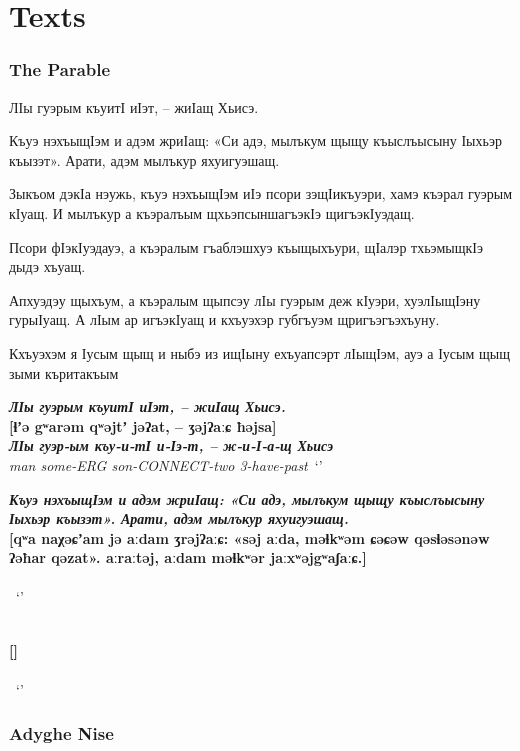 \documentclass[a4paper,12pt]{book}
\newcommand{\1}[1]{\textbf{\emph{#1}}} %
\newcommand{\2}[1]{\textbf{[#1]}} %
\newcommand{\3}[1]{\fontsize{11pt}{0cm}\textbf{\emph{#1}}} %
\newcommand{\4}[1]{\fontsize{10pt}{0cm}\emph{#1}}	%
\newcommand{\5}[1]{\textbf{/#1/}} %
\newcommand{\6}[1]{\textbf{[#1]}} %
\newcommand{\7}[1]{\fontsize{12pt}{0cm}\emph{#1}} %
\newcommand{\8}[1]{\fontsize{12pt}{0cm}`#1'} %
\newcommand{\9}[1]{\fontsize{12pt}{0cm}(lit. `#1')} %
\begin{document}
\chapter{Texts}
\subsection{The Parable}
ЛӀы гуэрым къуитӀ иӀэт, – жиӀащ Хьисэ. 

Къуэ нэхъыщӀэм и адэм жриӀащ: «Си адэ, мылъкум щыщу къыслъысыну Ӏыхьэр къызэт». Арати, адэм мылъкур яхуигуэшащ.

Зыкъом дэкӀа нэужь, къуэ нэхъыщӀэм иӀэ псори зэщӀикъуэри, хамэ къэрал гуэрым кӀуащ. И мылъкур а къэралъым щхьэпсыншагъэкӀэ щигъэкӀуэдащ. 

Псори фӀэкӀуэдауэ, а къэралым гъаблэшхуэ къыщыхъури, щӀалэр тхьэмыщкӀэ дыдэ хъуащ. 

Апхуэдэу щыхъум, а къэралым щыпсэу лӀы гуэрым деж кӀуэри, хуэлӀыщӀэну гурыӀуащ. А лӀым ар игъэкӀуащ и кхъуэхэр губгъуэм щригъэгъэхъуну.

Кхъуэхэм я Ӏусым щыщ и ныбэ из ищӀыну ехъуапсэрт лӀыщӀэм, ауэ а Ӏусым щыщ зыми къритакъым

\begin{exe}
\ex
\1{ЛӀы гуэрым къуитӀ иӀэт, – жиӀащ Хьисэ.}\\
\2{ɬʼə gʷarəm qʷəjtʼ jəʔat, – ʒəjʔaːɕ ħəjsa}\\
\3{ЛӀы гуэр-ым къу-и-тӀ и-Ӏэ-т, – ж-и-Ӏ-а-щ Хьисэ}\\
\4{man some-ERG son-CONNECT-two 3-have-past}\
\trans \8{}

\ex
\1{Къуэ нэхъыщӀэм и адэм жриӀащ: «Си адэ, мылъкум щыщу къыслъысыну Ӏыхьэр къызэт». Арати, адэм мылъкур яхуигуэшащ.}\\
\2{qʷa naχəɕʼam jə aːdam ʒrəjʔaːɕ: «səj aːda, məɬkʷəm ɕəɕəw qəsɬəsənəw ʔəħar qəzat». aːraːtəj, aːdam məɬkʷər jaːxʷəjgʷaʃaːɕ.}\\
\3{}\\
\4{}\
\trans \8{}


\ex
\1{}\\
\2{}\\
\3{}\\
\4{}\
\trans \8{}
\end{exe}


\subsection{Adyghe Nise}
\end{document}
